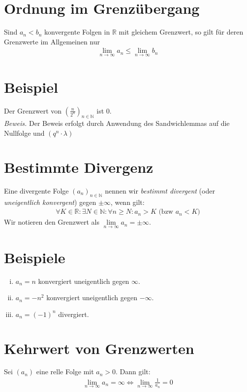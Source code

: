 \documentclass{scrreprt}
\newenvironment{proof}{\emph{\\Beweis.}}{}
\newcommand{\NN}{\mathbb{N}}
\newcommand{\RR}{\mathbb{R}}
\begin{document}
    \section{Ordnung im Grenzübergang}
    Sind $a_n < b_n$ konvergente Folgen in $\RR$ mit gleichem Grenzwert, so gilt für deren Grenzwerte im Allgemeinen nur
    \begin{align*}
        \lim\limits_{n \to \infty} a_n \leq \lim\limits_{n \to \infty} b_n
    \end{align*}

    \section{Beispiel}
    Der Grenzwert von $(\frac{n}{2^n})_{n \in \NN}$ ist 0.
    \begin{proof} Der Beweis erfolgt durch Anwendung des Sandwichlemmas auf die Nullfolge und $(q^n \cdot \lambda )$ \end{proof}

    \section{Bestimmte Divergenz}
    Eine divergente Folge $(a_n)_{n \in \NN}$ nennen wir \emph{bestimmt divergent} (oder \emph{uneigentlich konvergent}) gegen $\pm \infty$, wenn gilt:
    \begin{align*}
        \forall K \in \RR: \exists N \in \NN: \forall n \geq N: a_n > K \text{ (bzw $a_n < K$)}
    \end{align*}
    Wir notieren den Grenzwert als $\lim\limits_{n \to \infty} a_n = \pm \infty$.

    \section{Beispiele}
    \begin{enumerate}[i)]
        \item
            $a_n = n$ konvergiert uneigentlich gegen $\infty$.
        \item
            $a_n = -n^2$ konvergiert uneigentlich gegen $- \infty$.
        \item
            $a_n = (-1)^n$ divergiert.
    \end{enumerate}

    \section{Kehrwert von Grenzwerten}
    Sei $(a_n)$ eine relle Folge mit $a_n > 0$. Dann gilt:
    \begin{align*}
        \lim\limits_{n \to \infty} a_n = \infty \Leftrightarrow \lim\limits_{n \to \infty} \frac{1}{a_n} = 0
    \end{align*}
\end{document}
